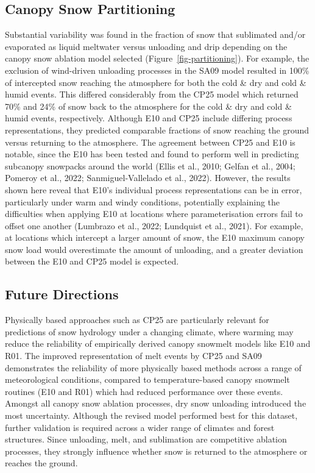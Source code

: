 \documentclass[
]{agujournal2019}
\begin{document}
\subsection{Canopy Snow Partitioning}\label{canopy-snow-partitioning-1}

Substantial variability was found in the fraction of snow that
sublimated and/or evaporated as liquid meltwater versus unloading and
drip depending on the canopy snow ablation model selected
(Figure~\ref{fig-partitioning}). For example, the exclusion of
wind-driven unloading processes in the SA09 model resulted in 100\% of
intercepted snow reaching the atmosphere for both the cold \& dry and
cold \& humid events. This differed considerably from the CP25 model
which returned 70\% and 24\% of snow back to the atmosphere for the cold
\& dry and cold \& humid events, respectively. Although E10 and CP25
include differing process representations, they predicted comparable
fractions of snow reaching the ground versus returning to the
atmosphere. The agreement between CP25 and E10 is notable, since the E10
has been tested and found to perform well in predicting subcanopy
snowpacks around the world (Ellis et al., 2010; Gelfan et al., 2004;
Pomeroy et al., 2022; Sanmiguel-Vallelado et al., 2022). However, the
results shown here reveal that E10's individual process representations
can be in error, particularly under warm and windy conditions,
potentially explaining the difficulties when applying E10 at locations
where parameterisation errors fail to offset one another (Lumbrazo et
al., 2022; Lundquist et al., 2021). For example, at locations which
intercept a larger amount of snow, the E10 maximum canopy snow load
would overestimate the amount of unloading, and a greater deviation
between the E10 and CP25 model is expected.

\subsection{Future Directions}\label{future-directions}

Physically based approaches such as CP25 are particularly relevant for
predictions of snow hydrology under a changing climate, where warming
may reduce the reliability of empirically derived canopy snowmelt models
like E10 and R01. The improved representation of melt events by CP25 and
SA09 demonstrates the reliability of more physically based methods
across a range of meteorological conditions, compared to
temperature-based canopy snowmelt routines (E10 and R01) which had
reduced performance over these events. Amongst all canopy snow ablation
processes, dry snow unloading introduced the most uncertainty. Although
the revised model performed best for this dataset, further validation is
required across a wider range of climates and forest structures. Since
unloading, melt, and sublimation are competitive ablation processes,
they strongly influence whether snow is returned to the atmosphere or
reaches the ground.
\end{document}
